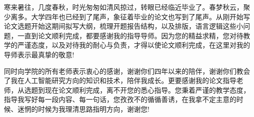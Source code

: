 寒来暑往，几度春秋，时光匆匆如清风掠过，转眼已经临近毕业了。春梦秋云，聚少离多。大学四年也已经到了尾声，象征着毕业的论文也写到了尾声。从刚开始写论文选题开始这期间拟写大纲，梳理开题报告结构，以及排版，语言逻辑这些小问题，一直到论文顺利完成，都要感谢我的指导导师。因为您的精益求精，您对待教学的严谨态度，以及对待我的耐心与负责，才得以使论文顺利完成，在这里对我的导师表示最真挚的敬意!

同时向学院的所有老师表示衷心的感谢，谢谢你们四年以来的陪伴，谢谢你们教会了我在人工智能研究方向的知识和技术，陪伴我成长。更要感谢我的论文指导老师，从选题到现在论文顺利完成，离不开您的悉心指导。您秉着严谨的教学态度，指导我写好每一段内容、每一句话，您孜孜不的循循善诱，在我拿不定主意的时候、迷惘的时候为我理清思路指明方向，谢谢您!

